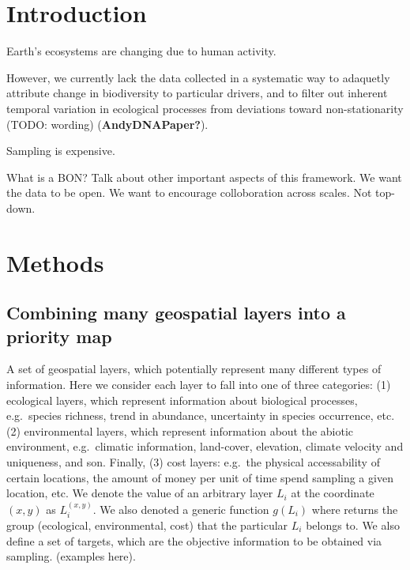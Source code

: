 \documentclass[10pt,oneside]{article}
\begin{document}
\hypertarget{introduction}{%
\section{Introduction}\label{introduction}}

Earth's ecosystems are changing due to human activity.

However, we currently lack the data collected in a systematic way to
adaquetly attribute change in biodiversity to particular drivers, and to
filter out inherent temporal variation in ecological processes from
deviations toward non-stationarity (TODO: wording)
(\textbf{AndyDNAPaper?}).

Sampling is expensive.

What is a BON? Talk about other important aspects of this framework. We
want the data to be open. We want to encourage colloboration across
scales. Not top-down.

\hypertarget{methods}{%
\section{Methods}\label{methods}}

\hypertarget{combining-many-geospatial-layers-into-a-priority-map}{%
\subsection{Combining many geospatial layers into a priority
map}\label{combining-many-geospatial-layers-into-a-priority-map}}

A set of geospatial layers, which potentially represent many different
types of information. Here we consider each layer to fall into one of
three categories: (1) ecological layers, which represent information
about biological processes, e.g.~species richness, trend in abundance,
uncertainty in species occurrence, etc. (2) environmental layers, which
represent information about the abiotic environment, e.g.~climatic
information, land-cover, elevation, climate velocity and uniqueness, and
son. Finally, (3) cost layers: e.g.~the physical accessability of
certain locations, the amount of money per unit of time spend sampling a
given location, etc. We denote the value of an arbitrary layer \(L_i\)
at the coordinate \((x,y)\) as \(L_i^{(x,y)}\). We also denoted a
generic function \(g(L_i)\) where returns the group (ecological,
environmental, cost) that the particular \(L_i\) belongs to. We also
define a set of targets, which are the objective information to be
obtained via sampling. (examples here).
\end{document}
